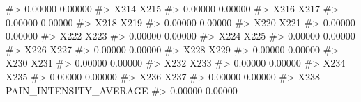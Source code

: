 \documentclass[
  letterpaper,
]{krantz}
\makeatletter
\newenvironment{Shaded}{\begin{snugshade}}{\end{snugshade}}
\newcommand{\CommentTok}[1]{\textcolor[rgb]{0.37,0.37,0.37}{#1}}
\newenvironment{kframe}{%
\medskip{}
\setlength{\fboxsep}{.8em}
 \def\at@end@of@kframe{}%
 \ifinner\ifhmode%
  \def\at@end@of@kframe{\end{minipage}}%
  \begin{minipage}{\columnwidth}%
 \fi\fi%
 \def\FrameCommand##1{\hskip\@totalleftmargin \hskip-\fboxsep
 \colorbox{shadecolor}{##1}\hskip-\fboxsep
     \hskip-\linewidth \hskip-\@totalleftmargin \hskip\columnwidth}%
 \MakeFramed {\advance\hsize-\width
   \@totalleftmargin\z@ \linewidth\hsize
   \@setminipage}}%
 {\par\unskip\endMakeFramed%
 \at@end@of@kframe}
\renewenvironment{Shaded}{\begin{kframe}}{\end{kframe}}
\makeatother
\begin{document}
\begin{Shaded}
\begin{Highlighting}[]
\CommentTok{\#\textgreater{}                          0.00000                          0.00000 }
\CommentTok{\#\textgreater{}                             X214                             X215 }
\CommentTok{\#\textgreater{}                          0.00000                          0.00000 }
\CommentTok{\#\textgreater{}                             X216                             X217 }
\CommentTok{\#\textgreater{}                          0.00000                          0.00000 }
\CommentTok{\#\textgreater{}                             X218                             X219 }
\CommentTok{\#\textgreater{}                          0.00000                          0.00000 }
\CommentTok{\#\textgreater{}                             X220                             X221 }
\CommentTok{\#\textgreater{}                          0.00000                          0.00000 }
\CommentTok{\#\textgreater{}                             X222                             X223 }
\CommentTok{\#\textgreater{}                          0.00000                          0.00000 }
\CommentTok{\#\textgreater{}                             X224                             X225 }
\CommentTok{\#\textgreater{}                          0.00000                          0.00000 }
\CommentTok{\#\textgreater{}                             X226                             X227 }
\CommentTok{\#\textgreater{}                          0.00000                          0.00000 }
\CommentTok{\#\textgreater{}                             X228                             X229 }
\CommentTok{\#\textgreater{}                          0.00000                          0.00000 }
\CommentTok{\#\textgreater{}                             X230                             X231 }
\CommentTok{\#\textgreater{}                          0.00000                          0.00000 }
\CommentTok{\#\textgreater{}                             X232                             X233 }
\CommentTok{\#\textgreater{}                          0.00000                          0.00000 }
\CommentTok{\#\textgreater{}                             X234                             X235 }
\CommentTok{\#\textgreater{}                          0.00000                          0.00000 }
\CommentTok{\#\textgreater{}                             X236                             X237 }
\CommentTok{\#\textgreater{}                          0.00000                          0.00000 }
\CommentTok{\#\textgreater{}                             X238           PAIN\_INTENSITY\_AVERAGE }
\CommentTok{\#\textgreater{}                          0.00000                          0.00000 }

\end{Highlighting}
\end{Shaded}
\end{document}
